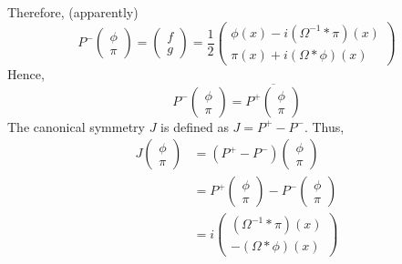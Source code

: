 \documentclass[12pt,oneside]{article}
\begin{document}
Therefore, (apparently)
\begin{equation}
P^{-}\begin{pmatrix}\phi \\ \pi\end{pmatrix}=\begin{pmatrix}f \\ g\end{pmatrix}=\frac{1}{2}\begin{pmatrix}\phi(x)-i(\Omega^{-1}*\pi)(x)  \\ \pi(x)+i(\Omega*\phi)(x)\end{pmatrix}
\end{equation}
Hence,
\begin{equation}
P^{-}\begin{pmatrix}\phi \\ \pi\end{pmatrix}=\overline{P^{+}\begin{pmatrix}\phi \\ \pi\end{pmatrix}}
\end{equation}
The canonical symmetry $J$ is defined as $J=P^{+}-P^{-}$. Thus,
\begin{align}
J\begin{pmatrix}\phi \\ \pi\end{pmatrix}&=(P^{+}-P^{-})\begin{pmatrix}\phi \\ \pi\end{pmatrix}\\
&=P^{+}\begin{pmatrix}\phi \\ \pi\end{pmatrix}-P^{-}\begin{pmatrix}\phi \\ \pi\end{pmatrix}\\
&=i\begin{pmatrix}
\left(\Omega^{-1}*\pi\right)(x) \\ -\left(\Omega*\phi\right)(x)
\end{pmatrix}
\end{align}
\end{document}

